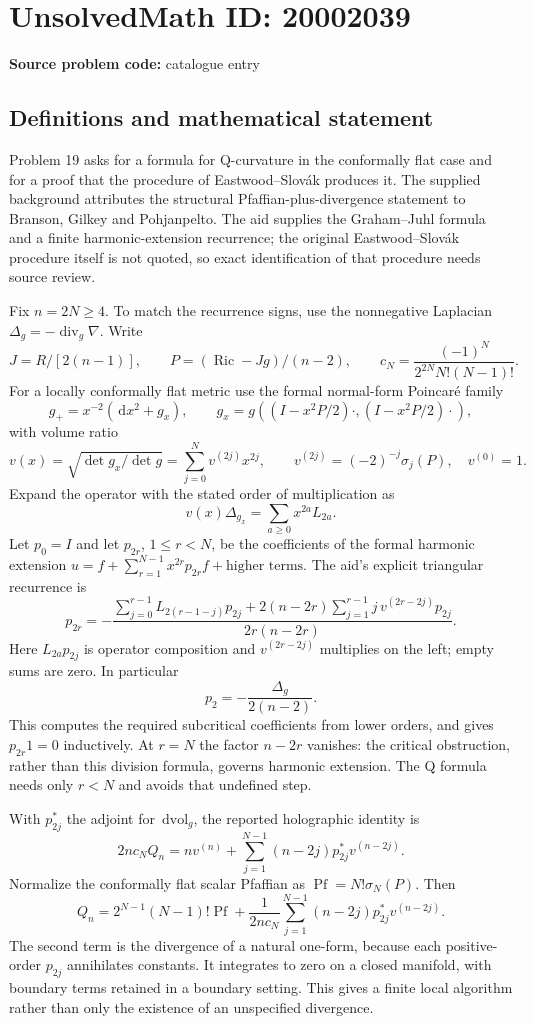 \documentclass[11pt]{article}
\newcommand{\dd}{\,\mathrm{d}}
\begin{document}
\section*{UnsolvedMath ID: 20002039}
\textbf{Source problem code:} catalogue entry
\subsection{Definitions and mathematical statement}
Problem 19 asks for a formula for Q-curvature in the conformally flat case and for a proof that the procedure of Eastwood--Slovák produces it. The supplied background attributes the structural Pfaffian-plus-divergence statement to Branson, Gilkey and Pohjanpelto. The aid supplies the Graham--Juhl formula and a finite harmonic-extension recurrence; the original Eastwood--Slovák procedure itself is not quoted, so exact identification of that procedure needs source review.

Fix \(n=2N\geq4\). To match the recurrence signs, use the nonnegative Laplacian \(\Delta_g=-\operatorname{div}_g\nabla\). Write
\[
 J=R/[2(n-1)],\qquad
 P=(\operatorname{Ric}-Jg)/(n-2),\qquad
 c_N=\frac{(-1)^N}{2^{2N}N!(N-1)!}.
\]
For a locally conformally flat metric use the formal normal-form Poincaré family
\[
 g_+=x^{-2}(\dd x^2+g_x),\qquad
 g_x=g((I-x^2P/2)\cdot,(I-x^2P/2)\cdot),
\]
with volume ratio
\[
 v(x)=\sqrt{\det g_x/\det g}=\sum_{j=0}^Nv^{(2j)}x^{2j},
 \qquad v^{(2j)}=(-2)^{-j}\sigma_j(P),\quad v^{(0)}=1.
\]
Expand the operator with the stated order of multiplication as
\[
 v(x)\Delta_{g_x}=\sum_{a\geq0}x^{2a}L_{2a}.
\]
Let \(p_0=I\) and let \(p_{2r}\), \(1\leq r<N\), be the coefficients of the formal harmonic extension
\(u=f+\sum_{r=1}^{N-1}x^{2r}p_{2r}f+\text{higher terms}\).
The aid's explicit triangular recurrence is
\[
 p_{2r}=-\frac{
 \displaystyle\sum_{j=0}^{r-1}L_{2(r-1-j)}p_{2j}
 +2(n-2r)\displaystyle\sum_{j=1}^{r-1}
       j\,v^{(2r-2j)}p_{2j}}
 {2r(n-2r)}.
\]
Here \(L_{2a}p_{2j}\) is operator composition and \(v^{(2r-2j)}\) multiplies on the left; empty sums are zero. In particular
\[
 p_2=-\frac{\Delta_g}{2(n-2)}.
\]
This computes the required subcritical coefficients from lower orders, and gives \(p_{2r}1=0\) inductively. At \(r=N\) the factor \(n-2r\) vanishes: the critical obstruction, rather than this division formula, governs harmonic extension. The Q formula needs only \(r<N\) and avoids that undefined step.

With \(p_{2j}^*\) the adjoint for \(\dd\mathrm{vol}_g\), the reported holographic identity is
\[
 2n c_NQ_n=n v^{(n)}+
 \sum_{j=1}^{N-1}(n-2j)p_{2j}^*v^{(n-2j)}.
\]
Normalize the conformally flat scalar Pfaffian as \(\operatorname{Pf}=N!\sigma_N(P)\). Then
\[
 Q_n=2^{N-1}(N-1)!\operatorname{Pf}
 +\frac1{2n c_N}\sum_{j=1}^{N-1}
       (n-2j)p_{2j}^*v^{(n-2j)}.
\]
The second term is the divergence of a natural one-form, because each positive-order \(p_{2j}\) annihilates constants. It integrates to zero on a closed manifold, with boundary terms retained in a boundary setting. This gives a finite local algorithm rather than only the existence of an unspecified divergence.
\end{document}
